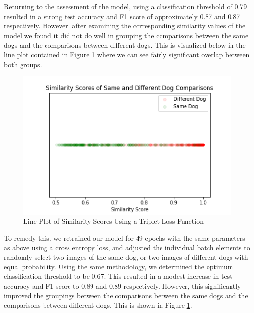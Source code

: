 \documentclass{article}
\begin{document}
Returning to the assessment of the model, using a classification threshold of 0.79 resulted in a strong test accuracy and F1 score of approximately 0.87 and 0.87 respectively.  However, after examining the corresponding similarity values of the model we found it did not do well in grouping the comparisons between the same dogs and the comparisons between different dogs.  This is visualized below in the line plot contained in Figure \ref{fig:x triplet lineplot} where we can see fairly significant overlap between both groups.

\begin{figure}[h]
\centering
	\includegraphics[scale=0.7]{final-report-images/triplet_lineplot.png}
\caption{Line Plot of Similarity Scores Using a Triplet Loss Function}
\label{fig:x triplet lineplot}
\end{figure}
\noindent To remedy this, we retrained our model for 49 epochs with the same parameters as above using a cross entropy loss, and adjusted the individual batch elements to randomly select two images of the same dog, or two images of different dogs with equal probability.  Using the same methodology, we determined the optimum classification threshold to be 0.67.  This resulted in a modest increase in test accuracy and F1 score to 0.89 and 0.89 respectively.  However, this significantly improved the groupings between the comparisons between the same dogs and the comparisons between different dogs. This is shown in Figure \ref{fig:x triplet lineplot}. 
\end{document}
